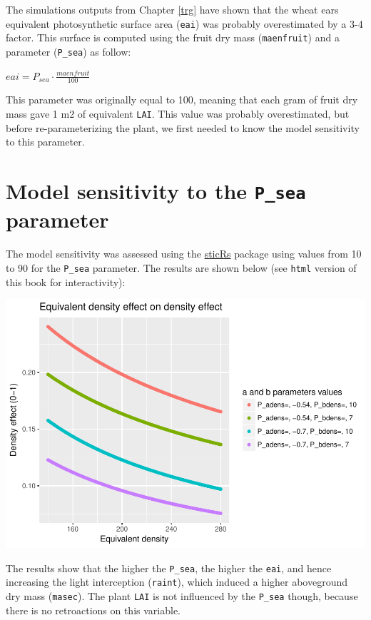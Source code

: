 \documentclass[
]{book}
\begin{document}
The simulations outputs from Chapter \ref{trg} have shown that the wheat ears equivalent photosynthetic surface area (\texttt{eai}) was probably overestimated by a 3-4 factor. This surface is computed using the fruit dry mass (\texttt{maenfruit}) and a parameter (\texttt{P\_sea}) as follow:

\(eai=P_{sea}\cdot\frac{maenfruit}{100}\)

This parameter was originally equal to 100, meaning that each gram of fruit dry mass gave 1 m2 of equivalent \texttt{LAI}. This value was probably overestimated, but before re-parameterizing the plant, we first needed to know the model sensitivity to this parameter.

\hypertarget{model-sensitivity-to-the-p_sea-parameter}{%
\section{\texorpdfstring{Model sensitivity to the \texttt{P\_sea} parameter}{Model sensitivity to the P\_sea parameter}}\label{model-sensitivity-to-the-p_sea-parameter}}

The model sensitivity was assessed using the \href{https://github.com/VEZY/sticRs}{sticRs} package using values from 10 to 90 for the \texttt{P\_sea} parameter. The results are shown below (see \texttt{html} version of this book for interactivity):

\includegraphics{Postdoc_steps_files/figure-latex/unnamed-chunk-12-1.pdf}

The results show that the higher the \texttt{P\_sea}, the higher the \texttt{eai}, and hence increasing the light interception (\texttt{raint}), which induced a higher aboveground dry mass (\texttt{masec}). The plant \texttt{LAI} is not influenced by the \texttt{P\_sea} though, because there is no retroactions on this variable.
\end{document}
